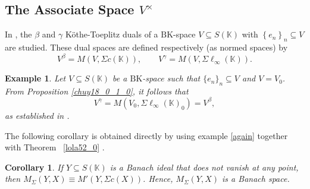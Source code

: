 \documentclass[14pt, a4paper]{article}  %
\providecommand{\llave}[1]{\left\lbrace #1\right\rbrace }
\providecommand{\pare}[1]{\left( #1\right) }
\newcommand{\K}{\mathbb{K}}
\newcommand{\BK}{\text{BK}}
\newcommand{\Mt}{M'}
\newtheorem{corollary}{Corollary}[section]
\newtheorem{example}{Example}[section]  %
\begin{document}
 


 

\subsection{The Associate Space $V^{\times}$}\label{subsec}
In \cite[p. 423]{K}, the $\beta$ and $\gamma$ Köthe-Toeplitz duals of a $\BK$-space $V\subseteq S\pare{\K}$   with $\llave{e_{n}}_{n}\subseteq V$ are studied. These dual spaces are defined respectively (as normed spaces) by
\begin{equation}  
	V^{\beta}=M\pare{V,\Sigma c\pare{\K}},\qquad V^{\gamma}=M\pare{V,\Sigma \ell_{\infty}\pare{\K}}. 
\end{equation}

 

\begin{example}
	Let $V\subseteq S(\K)$ be a $\BK$-space such that $\{e_{n}\}_{n}\subseteq V$ and $V=V_{0}$. From Proposition \ref{chuy18_0_1_0}, it follows that 
	\begin{equation}
		V^{\gamma}=M\pare{V_{0}, \Sigma \ell_{\infty}\pare{\K}_{0}}= V^{\beta},
	\end{equation} 
	as established in \cite[Thm. 7.2.7]{Wil}.
\end{example}

 

 

 
 	The following corollary is obtained directly by using  example \ref{again}  together with Theorem~ \ref{lola52_0} .

	\begin{corollary}\label{efren8}
	If $Y \subseteq S(\K)$ is a Banach ideal that does not vanish at any point, then
	$M_{\Sigma}(Y,X) \equiv \Mt(Y,\Sigma c(X))$. Hence, $M_{\Sigma}(Y,X)$ is a Banach space.
\end{corollary} 
\end{document}

